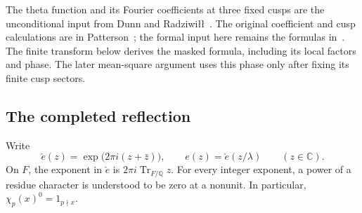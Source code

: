 \documentclass[11pt,a4paper]{article}
\numberwithin{equation}{section}
\numberwithin{figure}{section}
\theoremstyle{definition}
\theoremstyle{remark}
\begin{document}
The theta function and its Fourier coefficients at three fixed cusps are
the unconditional input from Dunn and Radziwi{\l}{\l}~\cite[Section~5 and
Appendix~A]{DR}.  The original coefficient and cusp calculations are in
Patterson~\cite[Theorem~8.1 and Sections~7--8]{Patterson}; the formal input
here remains the formulas in~\cite{DR}.  The finite transform below derives
the masked formula, including its local factors and phase.  The later
mean-square argument uses this phase only after fixing its finite cusp sectors.

\subsection{The completed reflection}

Write
\[
 \check e(z)=\exp\bigl(2\pi i(z+\bar z)\bigr),
 \qquad e(z)=\check e(z/\lambda)\qquad(z\in\mathbb C).
\]
On $F$, the exponent in $\check e$ is $2\pi i\operatorname{Tr}_{F/\mathbb Q}z$.
For every integer exponent, a power of a residue character is understood
to be zero at a nonunit.  In particular, $\chi_p(x)^0=1_{p\nmid x}$.
\end{document}
